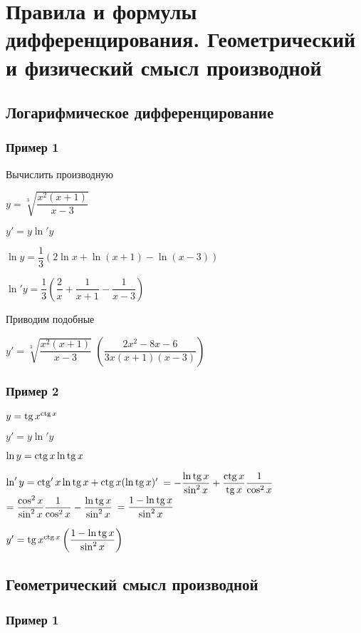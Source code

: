 \section{Правила и формулы дифференцирования. Геометрический и физический смысл производной}

\subsection{Логарифмическое дифференцирование}

\subsubsection{Пример 1}

Вычислить производную

$ y = \sqrt[3]{ \dfrac{x^{2}( x+1 )}{ x-3 } } $

$ y' = y \ln' y $

$ \ln y = \dfrac{1}{3} 
\left(
2 \ln x + \ln(x+1) - \ln(x-3)
\right)  $

$ \ln' y = \dfrac{1}{3} 
\left(
\dfrac{2}{x} + \dfrac{1}{x+1} - \dfrac{1}{x-3}
\right)  $

Приводим подобные

$ y' = \sqrt[3]{ \dfrac{x^{2}( x+1 )}{ x-3 } } $
$ \left( \dfrac{2x^{2} - 8x - 6}{3x(x+1)(x-3)} \right)  $

\subsubsection{Пример 2}

$ y = \operatorname{tg} x^{\operatorname{ctg} x}$

$ y' = y \ln' y $

$  \ln y = \operatorname{ctg} x \ln \operatorname{tg} x $

$  \ln' y = \operatorname{ctg}' x \ln \operatorname{tg} x + \operatorname{ctg} x (\ln \operatorname{tg} x)' $
$ = -\dfrac{\ln \operatorname{tg} x}{\sin^{2} x} +\dfrac{ \operatorname{ctg} x}{\operatorname{tg} x} \dfrac{1}{\cos^{2} x} $
$ = \dfrac{ \cos^{2} x}{\sin^{2} x} \dfrac{1}{\cos^{2} x} - \dfrac{\ln \operatorname{tg} x}{\sin^{2} x} $
$ = \dfrac{1 - \ln \operatorname{tg} x}{\sin^{2} x} $

$ y' = \operatorname{tg} x^{\operatorname{ctg} x} \left( \dfrac{1 - \ln \operatorname{tg} x}{\sin^{2} x} \right)  $

\subsection{Геометрический смысл производной}

\subsubsection{Пример 1}

